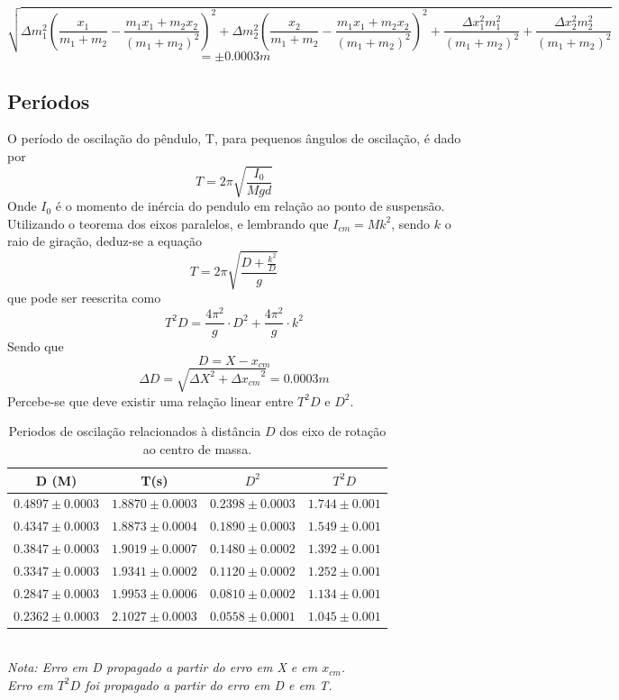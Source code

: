 \documentclass[12pt,a4paper]{article}
\begin{document}

$$\sqrt{\Delta m_{1}^{2} \left(\frac{x_{1}}{m_{1} + m_{2}} - \frac{m_{1} x_{1} + m_{2} x_{2}}{\left(m_{1} +  m_{2}\right)^{2}}\right)^{2} + \Delta m_{2}^{2} \left(\frac{x_{2}}{m_{1} + m_{2}} - \frac{m_{1} x_{1} + m_{2} x_{2}}{\left(m_{1} + m_{2}\right)^{2}}\right)^{2} + \frac{\Delta x_{1}^{2} m_{1}^{2}}{\left(m_{1} + m_{2}\right)^{2}} + \frac{\Delta x_{2}^{2} m_{2}^{2}}{\left(m_{1} + m_{2}\right)^{2}}} $$
$$ = \pm 0.0003m $$


\subsection{Períodos}
O período de oscilação do pêndulo, T, para pequenos ângulos de oscilação, é dado por
$$ T = 2 \pi \sqrt{\frac{I_0}{Mgd}} $$
Onde $I_0$ é o momento de inércia do pendulo em relação ao ponto de suspensão.
Utilizando o teorema dos eixos paralelos, e lembrando que $I_{cm} = Mk^2$, sendo 
$k$ o raio de giração, deduz-se a equação
$$ T = 2\pi\sqrt{\frac{D + \frac{k^2}{D}}{g}} $$ 
que pode ser reescrita como 
\begin{equation} \label{eq:funcao}
 T^2D = \frac{4\pi^2}{g} \cdot D^2 + \frac{4\pi^2}{g} \cdot k^2 
\end{equation}
Sendo que $$D = X - x_{cm} $$ 
$$ \Delta D = \sqrt{{\Delta X}^2 + {\Delta x_{cm}}^2}  = 0.0003 m$$
Percebe-se que deve existir uma relação linear entre $T^2D$ e $D^2$.






\begin{table}[!htbp]
\centering
\def\arraystretch{1.5}

\caption{ Periodos de oscilação relacionados à distância $D$ dos eixo de rotação ao centro de massa.}
\begin{tabular}{|c|c|c|c|}
\hline
D (M)& T(s) & $D^2$ & $T^2D$ \\
\hline
$0.4897\pm0.0003$ & $1.8870 \pm 0.0003$ & $0.2398\pm0.0003$ & $1.744 \pm 0.001$\\
\hline
$0.4347\pm0.0003$ & $1.8873 \pm 0.0004$ & $0.1890\pm0.0003$ & $1.549 \pm 0.001$\\
\hline
$0.3847\pm0.0003$ & $1.9019 \pm 0.0007$ & $0.1480\pm0.0002$ & $1.392 \pm 0.001$\\
\hline
$0.3347\pm0.0003$ & $1.9341 \pm 0.0002$ & $0.1120\pm0.0002$ & $1.252 \pm 0.001$\\
\hline
$0.2847\pm0.0003$ & $1.9953 \pm 0.0006$ & $0.0810\pm0.0002$ & $1.134 \pm 0.001$\\
\hline
$0.2362\pm0.0003$ & $2.1027 \pm 0.0003$ & $0.0558\pm0.0001$ & $1.045 \pm 0.001$\\
\hline
\end{tabular}
\\
\emph {Nota: Erro em D propagado a partir do erro em X e em $x_{cm}$.\\
			Erro em $T^2D$ foi propagado a partir do erro em D e em T.\\}
\end{table}
\end{document}
